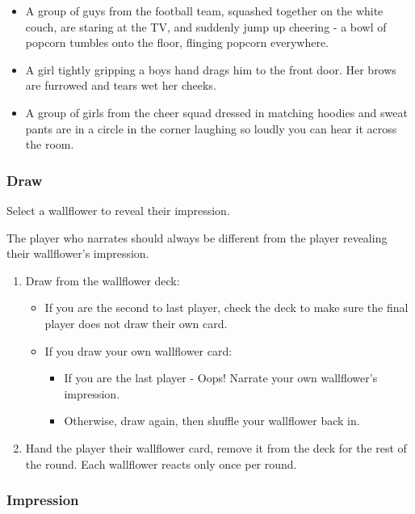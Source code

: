 \documentclass[letterpaper, 12pt]{article}
\newcommand{\vlinkrefsectionpartydraw}{section:partydraw}
\newcommand{\vlinkrefsectionpartyimpression}{section:partyimpression}
\newcommand{\clinkref}[1]{\label{#1}}
\begin{document}
{\begin{itemize}
\item A group of guys from the football team, squashed together on the white couch, are staring at the TV, and suddenly jump up cheering - a bowl of popcorn tumbles onto the floor, flinging popcorn everywhere.

\item A girl tightly gripping a boys hand drags him to the front door. Her brows are furrowed and tears wet her cheeks.

\item A group of girls from the cheer squad dressed in matching hoodies and sweat pants are in a circle in the corner laughing so loudly you can hear it across the room.


\end{itemize}


\pagebreak
\subsubsection{Draw} \clinkref{\vlinkrefsectionpartydraw}

Select a wallflower to reveal their impression.

The player who narrates should always be different from the player revealing their wallflower's impression.

\begin{enumerate}
	\item Draw from the wallflower deck:
	\begin{itemize}
		\item If you are the second to last player, check the deck to make sure the final player does not draw their own card.
		\item If you draw your own wallflower card:
			\begin{itemize}
				
				\item If you are the last player - Oops! Narrate your own wallflower's impression.
				\item Otherwise, draw again, then shuffle your wallflower back in.
			\end{itemize}
		
		
	\end{itemize}
	\item Hand the player their wallflower card, remove it from the deck for the rest of the round. Each wallflower reacts only once per round.
\end{enumerate}


\pagebreak
\subsubsection{Impression} \clinkref{\vlinkrefsectionpartyimpression}

}
\end{document}
